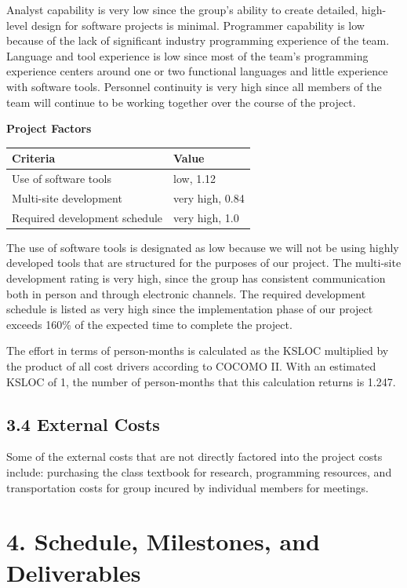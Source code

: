 \documentclass[]{article}
\begin{document}
Analyst capability is very low since the group's ability to create
detailed, high-level design for software projects is minimal. Programmer
capability is low because of the lack of significant industry
programming experience of the team. Language and tool experience is low
since most of the team's programming experience centers around one or
two functional languages and little experience with software tools.
Personnel continuity is very high since all members of the team will
continue to be working together over the course of the project.

\begin{center}
\textbf{Project Factors} \\
{
\centering
\begin{tabular}{ p{4cm} | p{4cm} }
Criteria & Value \\
\hline
Use of software tools & low, 1.12 \\
Multi-site development & very high, 0.84 \\
Required development schedule & very high, 1.0 \\
\end{tabular}
}
\end{center}

The use of software tools is designated as low because we will not be
using highly developed tools that are structured for the purposes of our
project. The multi-site development rating is very high, since the group
has consistent communication both in person and through electronic
channels. The required development schedule is listed as very high since
the implementation phase of our project exceeds 160\% of the expected
time to complete the project.

The effort in terms of person-months is calculated as the KSLOC
multiplied by the product of all cost drivers according to COCOMO II.
With an estimated KSLOC of 1, the number of person-months that this
calculation returns is 1.247.

\subsection{3.4 External Costs}\label{external-costs}

Some of the external costs that are not directly factored into the
project costs include: purchasing the class textbook for research,
programming resources, and transportation costs for group incured by
individual members for meetings.

\section{4. Schedule, Milestones, and
Deliverables}\label{schedule-milestones-and-deliverables}
\end{document}
